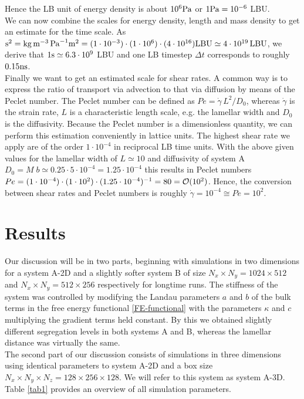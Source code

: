 \documentclass[8.5pt,twoside,twocolumn]{article}
\newcommand{\e}[1]{\cdot10^{#1}}
\newcommand{\gd}{\dot{\gamma}}
\begin{document}
Hence the LB unit of energy density is about $10^{6} \rm{Pa}$ or $1\rm{Pa}=10^{-6}$ LBU.\\
We can now combine the scales for energy density, length and mass density to get an estimate for the time scale.
As ${\rm s}^2=\rm{kg}\, \rm{m}^{-3}\, \rm{Pa}^{-1}\rm{m}^2=(1\e{-3}) \cdot (1\e{6}) \cdot (4\e{16})\rm{LBU}\simeq4\e{19} \,{\rm LBU}$, we derive that $1 \rm{s}\simeq6.3\e{9}$ LBU and one LB timestep $\Delta t$ corresponds to roughly $0.15 \rm{ns}$.\\
Finally we want to get an estimated scale for shear rates. 
A common way is to express the ratio of transport via advection to that via diffusion by means of the Peclet number.
The Peclet number can be defined as $Pe=\gd\, L^2/D_0$, whereas $\gd$ is the strain rate, $L$ is a characteristic length scale, e.g. the lamellar width and $D_0$ is the diffusivity.
Because the Peclet number is a dimensionless quantity, we can perform this estimation conveniently in lattice units.
The highest shear rate we apply are of the order $1\e{-4}$ in reciprocal LB time units.
With the above given values for the lamellar width of $L\simeq10$ and diffusivity of system A $D_0=M\;b\simeq 0.25 \cdot 5\e{-4}=1.25\e{-4}$ this results in Peclet numbers $Pe=(1\e{-4})\cdot(1\e{2})\cdot(1.25\e{-4})^{-1}=80={\cal O}(10^2)$.
Hence, the conversion between shear rates and Peclet numbers is roughly $\gd=10^{-4}\cong Pe=10^2$.

\section{Results}

Our discussion will be in two parts, beginning with simulations in two dimensions for a system A-2D and a slightly softer system B of size $N_x\times N_y=1024\times 512$ and $N_x \times N_y=512\times 256$ respectively for longtime runs.
The stiffness of the system was controlled by modifying the Landau parameters $a$ and $b$ of the bulk terms in the free energy functional \ref{FE-functional} with the parameters $\kappa$ and $c$ multiplying the gradient terms held constant.
By this we obtained slightly different segregation levels in both systems A and B, whereas the lamellar distance was virtually the same.\\
The second part of our discussion consists of simulations in three dimensions using identical parameters to system A-2D and a box size $N_x\times N_y\times N_z=128\times256\times128$.
We will refer to this system as system A-3D.
Table \ref{tab1} provides an overview of all simulation parameters.
\end{document}
